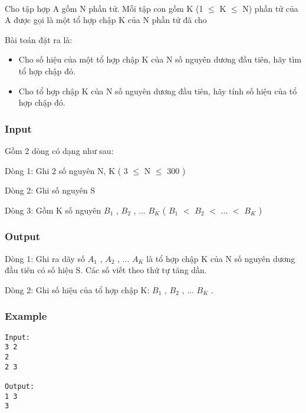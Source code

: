 

 

Cho tập hợp A gồm N phần tử. Mỗi tập con gồm K (1  $\le$  K  $\le$  N) phần tử của A được gọi là một tổ hợp chập K của N phần tử đã cho

Bài toán đặt ra là:
\begin{itemize}
	\item Cho số hiệu của một tổ hợp chập K của N số nguyên dương đầu tiên, hãy tìm tổ hợp chập đó.
	\item Cho tổ hợp chập K của N số nguyên dương đầu tiên, hãy tính số hiệu của tổ hợp chập đó.
\end{itemize}

\subsubsection{Input}

Gồm 2 dòng có dạng như sau:

Dòng 1: Ghi 2 số nguyên N, K ( 3  $\le$  N  $\le$  300 )

Dòng 2: Ghi số nguyên S

Dòng 3: Gồm K số nguyên $B_{1}$ , $B_{2}$ , ... $B_{K}$ ( $B_{1}$ $<$ $B_{2}$ $<$ ... $<$ $B_{K}$ )

\subsubsection{Output}

Dòng 1: Ghi ra dãy số $A_{1}$ , $A_{2}$ , ... $A_{K}$ là tổ hợp chập K của N số nguyên dương đầu tiên có số hiệu S. Các số viết theo thứ tự tăng dần.

Dòng 2: Ghi số hiệu của tổ hợp chập K: $B_{1}$ , $B_{2}$ , ... $B_{K}$ .

\subsubsection{Example}
\begin{verbatim}
Input:
3 2 
2
2 3

Output:
1 3
3

\end{verbatim}
